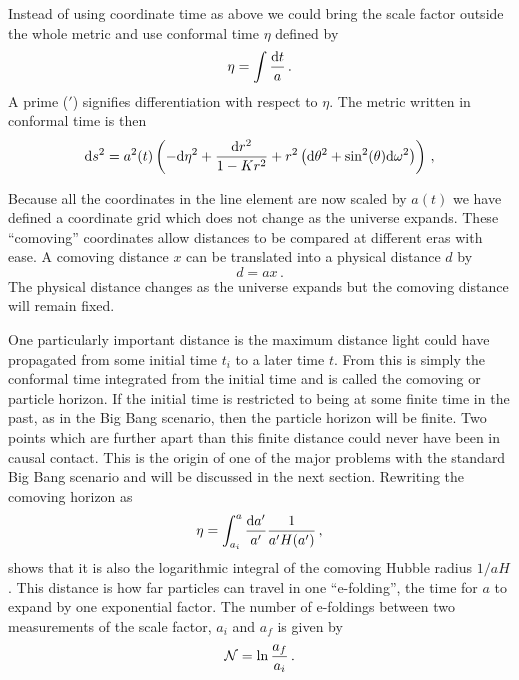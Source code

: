 Instead of using coordinate time as above we could bring
the scale factor outside the whole metric and use conformal time $\eta$
defined by
\begin{equation}
\label{eq:etatime-intro}
 \eta = \int\frac{\mathrm{d} t}{a}\,.
\end{equation}
A prime ($'$) signifies differentiation with respect to $\eta$. 
The metric written in conformal time is then 
% 
\begin{equation}
 \label{eq:frwconformal-intro}
\mathrm{d} s^2 = a^2(t)
  \left( -\mathrm{d}\eta^2 +
    \frac{\mathrm{d} r^2}{1-Kr^2} + r^2\left(\mathrm{d}\theta^2 + \sin^2(\theta)
\mathrm{d}\omega^2\right)
  \right)\,,
\end{equation}

% 
Because all the coordinates in the line element are now scaled by $a(t)$ we
have defined a coordinate grid which does not change as the universe expands.
These ``comoving'' coordinates allow distances to be compared at different
eras with ease. A comoving distance $x$ can be translated into a physical
distance $d$ by
% 
\begin{equation}
 \label{eq:comovingdefn-intro}
 d = ax \,.
\end{equation}
The physical distance changes as the universe expands but the comoving distance
will remain fixed. 

One particularly important distance is the maximum distance light could have
propagated from some initial time $t_i$ to a later time $t$. From
 this is simply the conformal time integrated from
the initial time and is called the comoving or particle horizon.
If the initial time is restricted to
being at some finite time in the past, as in the Big Bang scenario, then the
particle horizon will be finite. Two points which are further apart than
this finite distance could never have been in causal contact. This
is the origin of one of the major problems with the standard Big Bang scenario
and will be discussed in the next section.
Rewriting the comoving horizon as
% 
\begin{equation}
 \eta = \int_{a_i}^a \frac{\mathrm{d} a'}{a'} \frac{1}{a' H(a')} \,,
\end{equation}
shows that it is also the logarithmic integral of the comoving Hubble
radius $1/aH$. This distance is how far particles can travel in one
``e-folding'', the time for $a$ to expand by one exponential factor. 
The number of e-foldings between two measurements of the scale factor, $a_i$
and $a_f$ is given by
\begin{equation}
\label{eq:nefolddefn-intro}
 \mathcal{N} = \ln \frac{a_f}{a_i}\,.
\end{equation}

